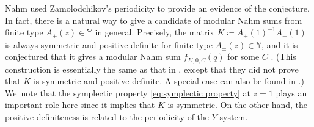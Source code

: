 \documentclass[pdftex]{sigma}
\numberwithin{equation}{section}
\theoremstyle{definition}
\begin{document}
Nahm used Zamolodchikov's periodicity to provide an evidence of the conjecture.
In fact, there is a natural way to give a candidate of modular Nahm sums from finite
type $A_\pm (z) \in \mathbb{Y}$ in general.
Precisely, the matrix $K \coloneqq A_{+}(1)^{-1} A_{-}(1)$ is
always symmetric and positive definite for finite type $A_\pm (z) \in \mathbb{Y}$,
and it is conjectured that it gives a modular Nahm sum $f_{K, 0, C} (q)$ for some $C$ \cite{mizuno2020difference}.
(This construction is essentially the same as that in \cite{KatoTerashima}, except that they did not prove
that $K$ is symmetric and positive definite. A special case can also be found in \cite{Lee}.)
We~note that the symplectic property \eqref{eq:symplectic property} at $z=1$ plays an important role
here since it implies that $K$ is symmetric.
On the other hand, the positive definiteness is related to the periodicity of the $Y$-system.
\end{document}
